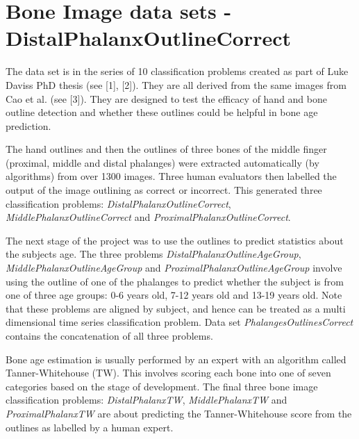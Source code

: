\chapter{Bone Image data sets -\/ Distal\+Phalanx\+Outline\+Correct}
\hypertarget{md_external_2data_2UCRArchive__2018_2DistalPhalanxOutlineCorrect_2README}{}\label{md_external_2data_2UCRArchive__2018_2DistalPhalanxOutlineCorrect_2README}
\label{md_external_2data_2UCRArchive__2018_2DistalPhalanxOutlineCorrect_2README_autotoc_md43}%
%
 The data set is in the series of 10 classification problems created as part of Luke Davis\textquotesingle{}s PhD thesis (see \mbox{[}1\mbox{]}, \mbox{[}2\mbox{]}). They are all derived from the same images from Cao et al. (see \mbox{[}3\mbox{]}). They are designed to test the efficacy of hand and bone outline detection and whether these outlines could be helpful in bone age prediction.

The hand outlines and then the outlines of three bones of the middle finger (proximal, middle and distal phalanges) were extracted automatically (by algorithms) from over 1300 images. Three human evaluators then labelled the output of the image outlining as correct or incorrect. This generated three classification problems\+: {\itshape Distal\+Phalanx\+Outline\+Correct}, {\itshape Middle\+Phalanx\+Outline\+Correct} and {\itshape Proximal\+Phalanx\+Outline\+Correct}.

The next stage of the project was to use the outlines to predict statistics about the subjects age. The three problems {\itshape Distal\+Phalanx\+Outline\+Age\+Group}, {\itshape Middle\+Phalanx\+Outline\+Age\+Group} and {\itshape Proximal\+Phalanx\+Outline\+Age\+Group} involve using the outline of one of the phalanges to predict whether the subject is from one of three age groups\+: 0-\/6 years old, 7-\/12 years old and 13-\/19 years old. Note that these problems are aligned by subject, and hence can be treated as a multi dimensional time series classification problem. Data set {\itshape Phalanges\+Outlines\+Correct} contains the concatenation of all three problems.

Bone age estimation is usually performed by an expert with an algorithm called Tanner-\/\+Whitehouse (TW). This involves scoring each bone into one of seven categories based on the stage of development. The final three bone image classification problems\+: {\itshape Distal\+Phalanx\+TW}, {\itshape Middle\+Phalanx\+TW} and {\itshape Proximal\+Phalanx\+TW} are about predicting the Tanner-\/\+Whitehouse score from the outlines as labelled by a human expert.

